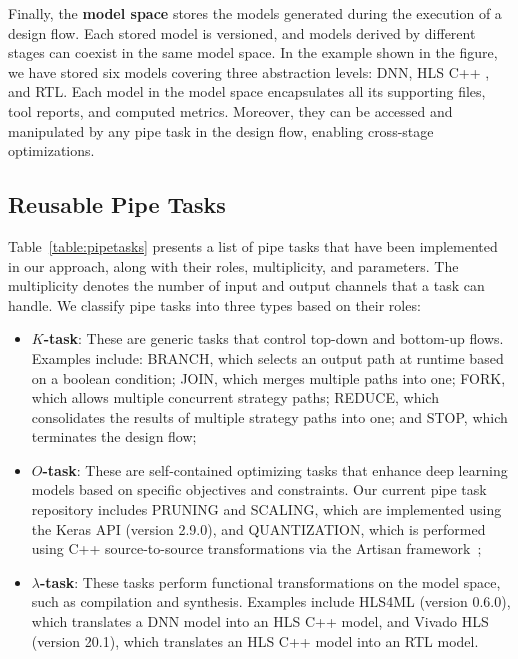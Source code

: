 Finally, the \textbf{model space} stores the models generated during the execution of a design flow. Each stored model is versioned, and models derived by different stages can coexist in the same model space. In the example shown in the figure, we have stored six models covering three abstraction levels: DNN, HLS C++ , and RTL. Each model in the model space encapsulates all its supporting files, tool reports, and computed metrics. Moreover, they can be accessed and manipulated by any pipe task in the design flow, enabling cross-stage optimizations.



\subsection{Reusable Pipe Tasks}

Table~\ref{table:pipetasks} presents a list of pipe tasks that have been implemented in our approach, along with their roles, multiplicity, and parameters. The multiplicity denotes the number of input and output channels that a task can handle. We classify pipe tasks into three types based on their roles:

\begin{itemize}

\item \textbf{$K$-task}: These are generic tasks that control top-down and bottom-up flows. Examples include: BRANCH, which selects an output path at runtime based on a boolean condition; JOIN, which merges multiple paths into one; FORK, which allows multiple concurrent strategy paths; REDUCE, which consolidates the results of multiple strategy paths into one; and STOP, which terminates the design flow;

\item \textbf{$O$-task}: These are self-contained optimizing tasks that enhance deep learning models based on specific objectives and constraints. Our current pipe task repository includes PRUNING and SCALING, which are implemented using the Keras API (version 2.9.0), and QUANTIZATION, which is performed using C++ source-to-source transformations via the Artisan framework~\cite{fccm20_artisan};

\item \textbf{$\lambda$-task}: These tasks perform functional transformations on the model space, such as compilation and synthesis. Examples include HLS4ML (version 0.6.0), which translates a DNN model into an HLS C++ model, and Vivado HLS (version 20.1), which translates an HLS C++ model into an RTL model.

\end{itemize}

